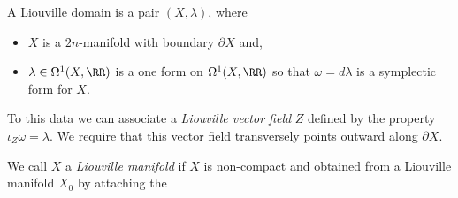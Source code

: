 
 
    A Liouville domain is a pair $(X,\lambda)$, where
    \begin{itemize}
       \item $X$ is a $2n$-manifold with boundary $\partial X$ and,
       \item $\lambda\in \Omega^1(X, \RR)$ is a one form on $\Omega^1(X, \RR)$ so that $\omega=d\lambda$ is a symplectic form for $X$.
    \end{itemize}
 To this data we can associate a \emph{Liouville vector field} $Z$ defined by the property $\iota_Z\omega= \lambda$.
 We require that this vector field transversely points outward along $\partial X$.

 We call $X$ a \emph{Liouville manifold} if $X$ is non-compact and obtained from a Liouville manifold $X_0$ by attaching the 
 \label{def:liouvilleDomain}
 